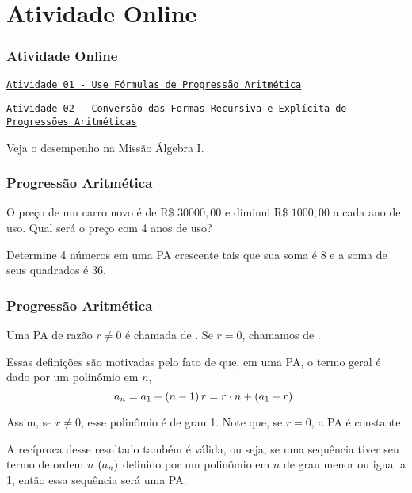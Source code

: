 \documentclass[brazil, notheorems, 10pt]{beamer}
\begin{document}
\section{Atividade Online}
\begin{frame}
\frametitle{Atividade Online} %

\href{https://pt.khanacademy.org/math/algebra/sequences/introduction-to-arithmetic-squences/e/arithmetic_sequences_2}
{{\tt Atividade 01 - Use Fórmulas de Progressão Aritmética}}

\href{https://pt.khanacademy.org/math/algebra/sequences/constructing-arithmetic-sequences/e/explicit-and-recursive-formulas-of-arithmetic-sequences}
{{\tt Atividade 02 - Conversão das Formas Recursiva e Explícita de
Progressões Aritméticas}}


Veja o desempenho na Missão Álgebra I.


\end{frame}

\begin{frame}
\frametitle{Progressão Aritmética} %

\begin{Exem}
O preço de um carro novo é de R\$ $30000{,}00$ e diminui R\$ $1000{,}00$
a cada ano de uso. Qual será o preço com 4 anos de uso?
\end{Exem}\pause

\begin{Exem}
Determine 4 números em uma PA crescente tais que sua soma é 8 e a
soma de seus quadrados é 36.
\end{Exem}


\end{frame}




\begin{frame}
\frametitle{Progressão Aritmética} %

\begin{Def}
Uma PA de razão $r \neq 0$ é chamada de . Se $r=0$, chamamos de .
\end{Def}

Essas definições são motivadas pelo fato de que, em uma PA, o termo
geral é dado por um polinômio em $n$, $$a_n = a_1 + \left(n-1\right) r =
r \cdot n + \left(a_1 - r\right).$$

Assim, se $r\neq 0$, esse polinômio é de grau 1. Note que, se $r=0$,
a PA é constante. \pause

A recíproca desse resultado também é válida, ou seja, se uma
sequência tiver seu termo de ordem $n$ $\left(a_n\right)$ definido por um
polinômio em $n$ de grau menor ou igual a 1, então essa sequência
será uma PA.

\end{frame}
\end{document}
